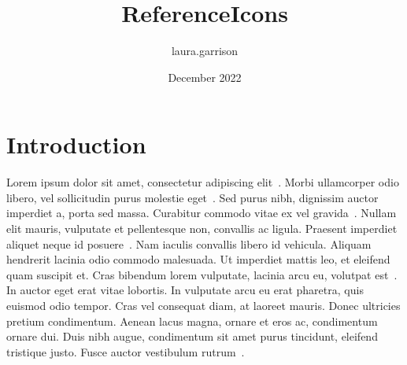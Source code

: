 \documentclass{article}
\title{ReferenceIcons}
\author{laura.garrison }
\date{December 2022}
\begin{document}
\maketitle

\section{Introduction}

Lorem ipsum dolor sit amet, consectetur adipiscing elit~\cite{mol}. Morbi ullamcorper odio libero, vel sollicitudin purus molestie eget~\cite{cell}. Sed purus nibh, dignissim auctor imperdiet a, porta sed massa. Curabitur commodo vitae ex vel gravida~\cite{tissue}. Nullam elit mauris, vulputate et pellentesque non, convallis ac ligula. Praesent imperdiet aliquet neque id posuere~\cite{organ}. Nam iaculis convallis libero id vehicula. Aliquam hendrerit lacinia odio commodo malesuada. Ut imperdiet mattis leo, et eleifend quam suscipit et. Cras bibendum lorem vulputate, lacinia arcu eu, volutpat est~\cite{multi}. In auctor eget erat vitae lobortis. In vulputate arcu eu erat pharetra, quis euismod odio tempor. Cras vel consequat diam, at laoreet mauris. Donec ultricies pretium condimentum. Aenean lacus magna, ornare et eros ac, condimentum ornare dui. Duis nibh augue, condimentum sit amet purus tincidunt, eleifend tristique justo. Fusce auctor vestibulum rutrum~\cite{survey}.




\end{document}
